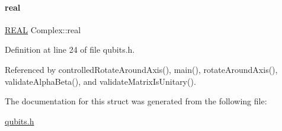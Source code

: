 \mbox{\label{structComplex_a479ad939835457595fcca3ca55c06283}} 
\paragraph{\texorpdfstring{real}{real}}
{\footnotesize\ttfamily \mbox{\hyperlink{precision_8h_a4b654506f18b8bfd61ad2a29a7e38c25}{R\+E\+AL}} Complex\+::real}



Definition at line 24 of file qubits.\+h.



Referenced by controlled\+Rotate\+Around\+Axis(), main(), rotate\+Around\+Axis(), validate\+Alpha\+Beta(), and validate\+Matrix\+Is\+Unitary().



The documentation for this struct was generated from the following file\+:\begin{DoxyCompactItemize}
\item 
\mbox{\hyperlink{qubits_8h}{qubits.\+h}}\end{DoxyCompactItemize}
